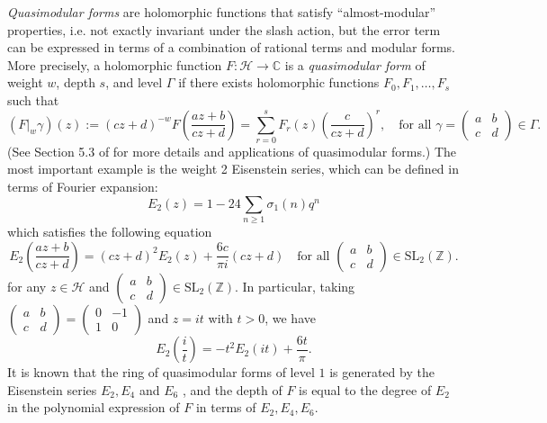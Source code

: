 \documentclass[10pt,reqno]{amsproc}
\newcommand{\SL}{\mathrm{SL}}
\newcommand{\bC}{\mathbb{C}}
\newcommand{\bZ}{\mathbb{Z}}
\newcommand{\cH}{\mathcal{H}}
\newcommand{\1}{\mathds{1}}	%
\theoremstyle{definition}
\theoremstyle{remark}
\begin{document}
\emph{Quasimodular forms} are holomorphic functions that satisfy ``almost-modular'' properties, i.e. not exactly invariant under the slash action, but the error term can be expressed in terms of a combination of rational terms and modular forms.
More precisely, a holomorphic function $F:\cH \to \bC$ is a \emph{quasimodular form} of weight $w$, depth $s$, and level $\Gamma$ if there exists holomorphic functions $F_0, F_1, \dots, F_s$ such that
\[
(F|_w \gamma)(z) := (cz + d)^{-w} F\left(\frac{az + b}{cz + d}\right) = \sum_{r=0}^{s} F_r(z)\left(\frac{c}{cz + d}\right)^r, \quad \text{for all }\gamma = \begin{pmatrix}
    a & b \\ c & d
\end{pmatrix} \in \Gamma.
\]
(See Section 5.3 of \cite{bruinier2008elliptic} for more details and applications of quasimodular forms.)
The most important example is the weight 2 Eisenstein series, which can be defined in terms of Fourier expansion:
\begin{equation}
    E_2(z) = 1 - 24 \sum_{n \ge 1} \sigma_1(n) q^n \label{eqn:e2fourier}
\end{equation}
which satisfies the following equation
\begin{equation}
    E_2\left(\frac{az + b}{cz + d}\right) = (cz + d)^2 E_2(z) + \frac{6c}{\pi i} (cz + d) \quad \text{for all } \begin{pmatrix} a & b \\ c & d \end{pmatrix} \in \SL_2(\bZ). \label{eqn:e2_transform}
\end{equation}
for any $z \in \cH$ and $\left(\begin{smallmatrix}
    a & b \\ c & d
\end{smallmatrix}\right) \in \SL_2(\bZ)$.
In particular, taking $\left(\begin{smallmatrix}a&b\\c&d \end{smallmatrix}\right)=\left(\begin{smallmatrix} 0 & -1 \\ 1 & 0 \end{smallmatrix}\right)$ and $z = it$ with $t > 0$, we have
\begin{equation}
    \label{eqn:e2_it}
    E_2\left(\frac{i}{t}\right) = -t^2 E_2(it) + \frac{6t}{\pi}.
\end{equation}
It is known that the ring of quasimodular forms of level $1$ is generated by the Eisenstein series $E_2, E_4$ and $E_6$ \cite{kaneko1995generalized}, and the depth of $F$ is equal to the degree of $E_2$ in the polynomial expression of $F$ in terms of $E_2, E_4, E_6$.
\end{document}
